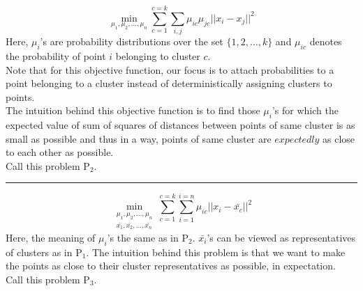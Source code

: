 \documentclass[12pt]{article}
\begin{document}
    $$\min_{ \mu_1,\mu_2,\dots,\mu_n}\sum_{c=1}^{c=k}\sum_{i,j}\mu_{ic}\mu_{jc}||x_i-x_j||^2$$
    Here, $\mu_i$'s are probability distributions over the set $\{1,2,\dots,k\}$ and $\mu_{ic}$ denotes the probability of point $i$ belonging to cluster $c$.\\
    Note that for this objective function, our focus is to attach probabilities to a point belonging to a cluster instead of deterministically assigning clusters to points.\\
    The intuition behind this objective function is to find those $\mu_i$'s for which the expected value of sum of squares of distances between points of same cluster is as small as possible and thus in a way, points of same cluster are $expectedly$ as close to each other as possible.\\
    Call this problem $\text{P}_2$.\\
     \vspace{10pt}
    \hrule
    $$\min_{\substack{\mu_1,\mu_2,\dots,\mu_n \\ \bar{x_1},\bar{x_2},\dots,\bar{x_n}}}\sum_{c=1}^{c=k}\sum_{i=1}^{i=n}\mu_{ic}||x_i-\bar{x_c}||^2$$
    Here, the meaning of $\mu_i$'s the same as in $\text{P}_2$. $\bar{x_i}$'s can be viewed as representatives of clusters as in $\text{P}_1$. The intuition behind this problem is that we want to make the points as close to their cluster representatives as possible, in expectation. \\
    Call this problem $\text{P}_3$.
\end{document}
